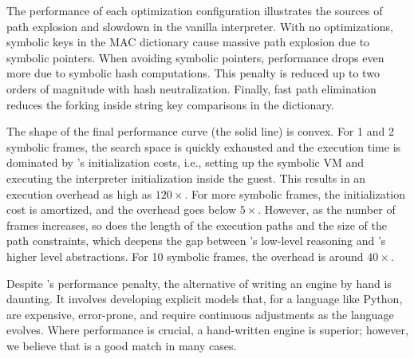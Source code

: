 
The performance of each optimization configuration illustrates the sources of path explosion and slowdown in the vanilla interpreter.  With no optimizations, symbolic keys in the MAC dictionary cause massive path explosion due to symbolic pointers.  When avoiding symbolic pointers, performance drops even more due to symbolic hash computations.  This penalty is reduced up to two orders of magnitude with hash neutralization.  Finally, fast path elimination reduces the forking inside string key comparisons in the dictionary.

The shape of the final performance curve (the solid line) is convex.  For 1 and 2 symbolic frames, the search space is quickly exhausted and the execution time is dominated by \chef's initialization costs, i.e., setting up the symbolic VM and executing the interpreter initialization inside the guest.  This results in an execution overhead as high as $120 \times$.  For more symbolic frames, the initialization cost is amortized, and the overhead goes below $5 \times$.  However, as the number of frames increases, so does the length of the execution paths and the size of the path constraints, which deepens the gap between \chef's low-level reasoning and \nicese's higher level abstractions.  For 10 symbolic frames, the overhead is around $40 \times$.

Despite \chef's performance penalty, the alternative of writing an engine by hand is daunting. It involves developing explicit models that, for a language like Python, are expensive, error-prone, and require continuous adjustments as the language evolves.
%
Where performance is crucial, a hand-written engine is superior; however, we believe that \chef is a good match in many cases.





